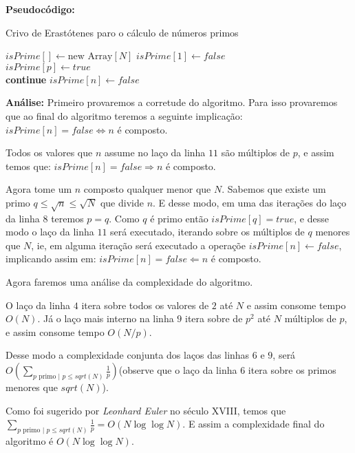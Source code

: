 \textbf{Pseudocódigo:}
\begin{algorithm}
\caption{Crivo de Erastótenes paro o cálculo de números primos}\label{crivo_erastotenes}
\begin{algorithmic}[1]
\State $isPrime[] \gets \text{new Array}[N]$ 
\State $isPrime[1] \gets false$
\\
\State $isPrime[p] \gets true$
\EndFor
\\
\State \textbf{continue}
\EndIf
{}
\State $isPrime[n] \gets false$
\EndFor
\EndFor
\\
\State {}
\EndProcedure
\end{algorithmic}
\end{algorithm}

\textbf{Análise:}
Primeiro provaremos a corretude do algoritmo. Para isso provaremos que ao final do algoritmo teremos a seguinte implicação:
$isPrime[n] = false \Leftrightarrow n$ é composto.

Todos os valores que $n$ assume no laço da linha $11$ são múltiplos de $p$, e assim temos que: $isPrime[n] = false \Rightarrow n$ é composto.

Agora tome um $n$ composto qualquer menor que $N$. Sabemos que existe um primo $q \leq \sqrt{n} \leq \sqrt{N}$ que divide $n$. 
E desse modo, em uma das iterações do laço da linha $8$ teremos $p=q$. Como $q$ é primo então $isPrime[q]=true$, e desse modo
o laço da linha $11$ será executado, iterando sobre os múltiplos de $q$ menores que $N$, ie, em alguma iteração será executado 
a operaçõe $isPrime[n]\gets false$, implicando assim em: $isPrime[n] = false \Leftarrow n$ é composto.

Agora faremos uma análise da complexidade do algoritmo.

O laço da linha $4$ itera sobre todos os valores de $2$ até $N$ e assim consome tempo $O(N)$.
Já o laço mais interno na linha $9$ itera sobre de $p^2$ até $N$ múltiplos de $p$, e assim consome tempo
$O(N/p)$. 

Desse modo a complexidade conjunta dos laços das linhas $6$ e $9$, será $O(\sum_{p \text{ primo | }p\leq sqrt(N)} \frac{1}{p})$(observe que o laço da linha $6$ itera sobre os primos menores que $sqrt(N)$). 

Como foi sugerido por \textit{Leonhard Euler} no século XVIII, temos que $\sum_{p \text{ primo | }p\leq sqrt(N)} \frac{1}{p} = O(N\log \log N)$. E assim a complexidade final do algoritmo é $O(N \log \log N)$.

